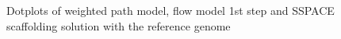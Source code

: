 \documentclass[12pt]{article}
\begin{document}
\begin{figure}[h!]
\begin{center}
{
}
\end{center}
\caption{Dotplots of weighted path model, flow model 1st step and SSPACE scaffolding solution with the reference genome}
\label{fig:dotpinus}
\end{figure}
\end{document}
